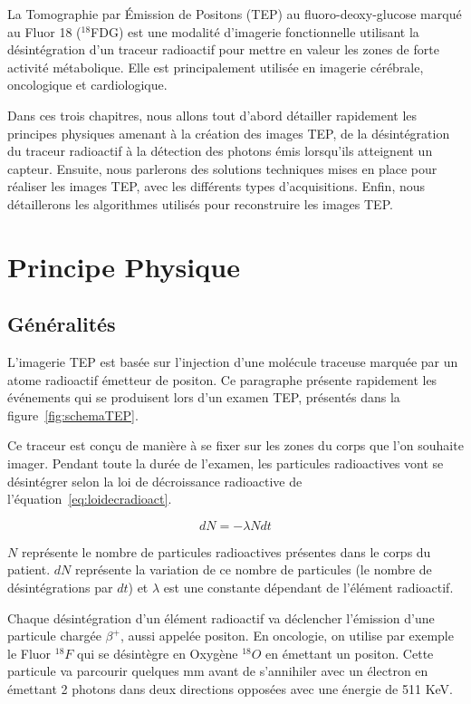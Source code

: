 \pagestyle{fancyplain}

\label{lab:chapPET}
La Tomographie par \'Emission de Positons (TEP) au fluoro-deoxy-glucose marqué au Fluor 18 ($^{18}$FDG) est une modalité d'imagerie fonctionnelle utilisant la désintégration d'un traceur radioactif pour mettre en valeur les zones de forte activité métabolique. Elle est principalement utilisée en imagerie cérébrale, oncologique et cardiologique.


Dans ces trois chapitres, nous allons tout d'abord détailler rapidement les principes physiques amenant à la création des images TEP, de la désintégration du traceur radioactif à la détection des photons émis lorsqu'ils atteignent un capteur. Ensuite, nous parlerons des solutions techniques mises en place pour réaliser les images TEP, avec les différents types d'acquisitions. Enfin, nous détaillerons les algorithmes utilisés pour reconstruire les images TEP.

 
\chapter{Principe Physique}

	\section{Généralités}

L'imagerie TEP est basée sur l'injection d'une molécule traceuse marquée par un atome radioactif émetteur de positon. Ce paragraphe présente rapidement les événements qui se produisent lors d'un examen TEP, présentés dans la figure~\ref{fig:schemaTEP}.

Ce traceur est conçu de manière à se fixer sur les zones du corps que l'on souhaite imager. Pendant toute la durée de l'examen, les particules radioactives vont se désintégrer selon la loi de décroissance radioactive de l'équation~\ref{eq:loidecradioact}.

\begin{equation}
	dN = - \lambda N dt
	\label{eq:loidecradioact}
\end{equation}

$N$ représente le nombre de particules radioactives présentes dans le corps du patient. $dN$ représente la variation de ce nombre de particules (le nombre de désintégrations par $dt$) et $\lambda$ est une constante dépendant de l'élément radioactif.

Chaque désintégration d'un élément radioactif va déclencher l'émission d'une particule chargée $\beta^+$, aussi appelée positon. En oncologie, on utilise par exemple le Fluor $^{18}F$ qui se désintègre en Oxygène $^{18}O$ en émettant un positon. Cette particule va parcourir quelques mm avant de s'annihiler avec un électron en émettant 2 photons dans deux directions opposées avec une énergie de 511 KeV.

